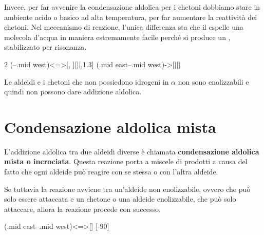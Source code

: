 Invece, per far avvenire la condensazione aldolica per i chetoni dobbiamo stare in ambiente acido o basico ad alta temperatura, per far aumentare la reattività dei chetoni. Nel meccanismo di reazione, l'unica differenza sta che il  espelle una molecola d'acqua in maniera estremamente facile perché si produce un , stabilizzato per risonanza.


\begin{reaction}
	2 
	\arrow(--.mid west){<=>[, \D][]}[,1.3]
	\arrow(.mid east--.mid west){->[][]}
\end{reaction}

Le aldeidi e i chetoni che non possiedono idrogeni in \(\alpha\) non sono enolizzabili e quindi non possono dare addizione aldolica.


\section{Condensazione aldolica mista}
L'addizione aldolica tra due aldeidi diverse è chiamata \textbf{condensazione aldolica mista o incrociata}. Questa reazione porta a miscele di prodotti a causa del fatto che ogni aldeide può reagire con se stessa o con l'altra aldeide.

Se tuttavia la reazione avviene tra un'aldeide non enolizzabile, ovvero che può solo essere attaccata e un chetone o una aldeide enolizzabile, che può solo attaccare, allora la reazione procede con successo.

\begin{reaction}
	\+
	\arrow(.mid east--.mid west){<=>[]}
	\arrow{->[*{0}calore][*{0}$-$ \ch{H2O}]}[-90]
\end{reaction}

